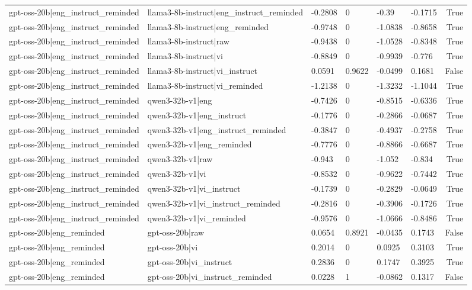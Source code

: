 \begin{table}
\begin{tabular}{llllllr}
gpt-oss-20b|eng_instruct_reminded & llama3-8b-instruct|eng_instruct_reminded & -0.2808 & 0 & -0.39 & -0.1715 & True \\
gpt-oss-20b|eng_instruct_reminded & llama3-8b-instruct|eng_reminded & -0.9748 & 0 & -1.0838 & -0.8658 & True \\
gpt-oss-20b|eng_instruct_reminded & llama3-8b-instruct|raw & -0.9438 & 0 & -1.0528 & -0.8348 & True \\
gpt-oss-20b|eng_instruct_reminded & llama3-8b-instruct|vi & -0.8849 & 0 & -0.9939 & -0.776 & True \\
gpt-oss-20b|eng_instruct_reminded & llama3-8b-instruct|vi_instruct & 0.0591 & 0.9622 & -0.0499 & 0.1681 & False \\
gpt-oss-20b|eng_instruct_reminded & llama3-8b-instruct|vi_reminded & -1.2138 & 0 & -1.3232 & -1.1044 & True \\
gpt-oss-20b|eng_instruct_reminded & qwen3-32b-v1|eng & -0.7426 & 0 & -0.8515 & -0.6336 & True \\
gpt-oss-20b|eng_instruct_reminded & qwen3-32b-v1|eng_instruct & -0.1776 & 0 & -0.2866 & -0.0687 & True \\
gpt-oss-20b|eng_instruct_reminded & qwen3-32b-v1|eng_instruct_reminded & -0.3847 & 0 & -0.4937 & -0.2758 & True \\
gpt-oss-20b|eng_instruct_reminded & qwen3-32b-v1|eng_reminded & -0.7776 & 0 & -0.8866 & -0.6687 & True \\
gpt-oss-20b|eng_instruct_reminded & qwen3-32b-v1|raw & -0.943 & 0 & -1.052 & -0.834 & True \\
gpt-oss-20b|eng_instruct_reminded & qwen3-32b-v1|vi & -0.8532 & 0 & -0.9622 & -0.7442 & True \\
gpt-oss-20b|eng_instruct_reminded & qwen3-32b-v1|vi_instruct & -0.1739 & 0 & -0.2829 & -0.0649 & True \\
gpt-oss-20b|eng_instruct_reminded & qwen3-32b-v1|vi_instruct_reminded & -0.2816 & 0 & -0.3906 & -0.1726 & True \\
gpt-oss-20b|eng_instruct_reminded & qwen3-32b-v1|vi_reminded & -0.9576 & 0 & -1.0666 & -0.8486 & True \\
gpt-oss-20b|eng_reminded & gpt-oss-20b|raw & 0.0654 & 0.8921 & -0.0435 & 0.1743 & False \\
gpt-oss-20b|eng_reminded & gpt-oss-20b|vi & 0.2014 & 0 & 0.0925 & 0.3103 & True \\
gpt-oss-20b|eng_reminded & gpt-oss-20b|vi_instruct & 0.2836 & 0 & 0.1747 & 0.3925 & True \\
gpt-oss-20b|eng_reminded & gpt-oss-20b|vi_instruct_reminded & 0.0228 & 1 & -0.0862 & 0.1317 & False \\

\end{tabular}
\end{table}
